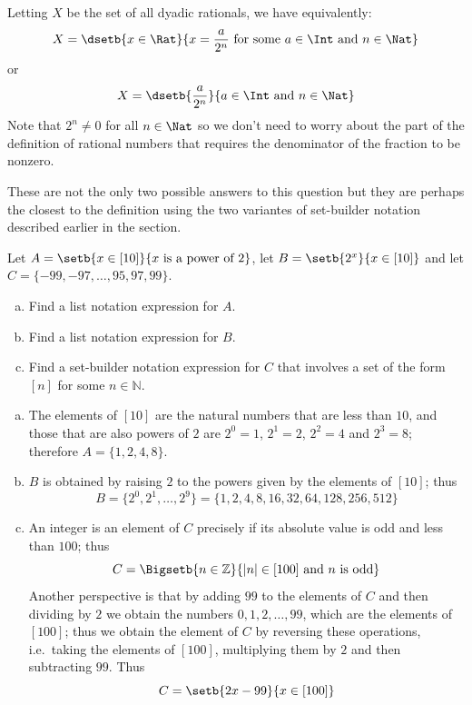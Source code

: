 \begin{solutions*}
Letting $X$ be the set of all dyadic rationals, we have equivalently:
\[ X = \dsetb{x \in \Rat}{x=\dfrac{a}{2^n} \text{ for some } a \in \Int \text{ and } n \in \Nat} \]
or
\[ X = \dsetb{\dfrac{a}{2^n}}{a \in \Int \text{ and } n \in \Nat} \]
Note that $2^n \ne 0$ for all $n \in \Nat$ so we don't need to worry about the part of the definition of rational numbers that requires the denominator of the fraction to be nonzero.

These are not the only two possible answers to this question but they are perhaps the closest to the definition using the two variantes of set-builder notation described earlier in the section.
\end{solutions*}

\begin{exercise}
\label{exNotationsInvolvingBrackteN}
Let $A = \setb{x \in [10]}{x \text{ is a power of } 2}$, let $B = \setb{2^x}{x \in [10]}$ and let $C = \{ {-99}, {-97}, \dots{}, 95, 97, 99 \}$.
\begin{enumerate}[(a)]
\item Find a list notation expression for $A$.
\item Find a list notation expression for $B$.
\item Find a set-builder notation expression for $C$ that involves a set of the form $[n]$ for some $n \in \mathbb{N}$.
\end{enumerate}
\end{exercise}

\begin{solutions*}
\fixlistskip
\begin{enumerate}[(a)]
\item The elements of $[10]$ are the natural numbers that are less than $10$, and those that are also powers of $2$ are $2^0=1$, $2^1=2$, $2^2=4$ and $2^3=8$; therefore $A = \{ 1, 2, 4, 8 \}$.
\item $B$ is obtained by raising $2$ to the powers given by the elements of $[10]$; thus
\[ B = \{ 2^0, 2^1, \dots, 2^9 \} = \{ 1, 2, 4, 8, 16, 32, 64, 128, 256, 512 \} \]
\item An integer is an element of $C$ precisely if its absolute value is odd and less than $100$; thus
\[ C = \Bigsetb{n \in \mathbb{Z}}{|n| \in [100] \text{ and } n \text{ is odd}} \]
Another perspective is that by adding $99$ to the elements of $C$ and then dividing by $2$ we obtain the numbers $0, 1, 2, \dots, 99$, which are the elements of $[100]$; thus we obtain the element of $C$ by reversing these operations, i.e.\ taking the elements of $[100]$, multiplying them by $2$ and then subtracting $99$. Thus
\[ C = \setb{2x-99}{x \in [100]} \]
\end{enumerate}
\end{solutions*}


